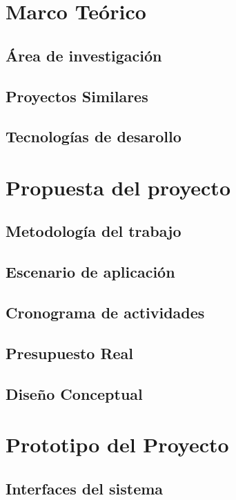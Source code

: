 \documentclass{extbook}
\begin{document}
\chapter{Marco Teórico}
  \section{Área de investigación}
    
    
  \section{Proyectos Similares}
    
  \section{Tecnologías de desarollo}
    

\chapter{Propuesta del proyecto}
  \section{Metodología del trabajo}
  \section{Escenario de aplicación}
  \section{Cronograma de actividades}
    
  \section{Presupuesto Real}
  \section{Diseño Conceptual}

\chapter{Prototipo del Proyecto}
  \section{Interfaces del sistema}
\end{document}
